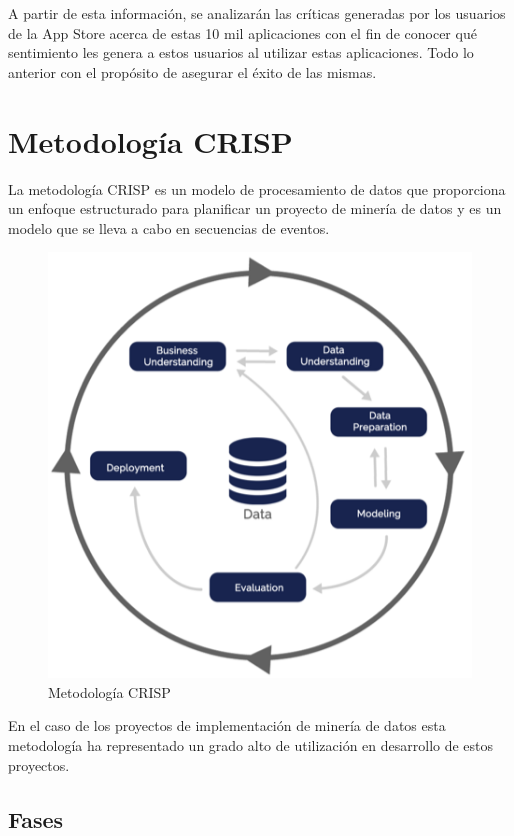 \documentclass[conference]{IEEEtran}
\begin{document}
A partir de esta información, se analizarán las críticas generadas por los usuarios de la App Store acerca de estas 10 mil aplicaciones con el fin de conocer qué sentimiento les genera a estos usuarios al utilizar estas aplicaciones. Todo lo anterior con el propósito de asegurar el éxito de las mismas.\\

\section{Metodología CRISP}
La metodología CRISP es un modelo de procesamiento de datos que proporciona un enfoque estructurado para planificar un proyecto de minería de datos y es un modelo que se lleva a cabo en secuencias de eventos.\\

\begin{figure}[htb]
\centering
\includegraphics[scale=1.2]{crisp-dm.png}
\caption{Metodología CRISP}
\end{figure}

En el caso de los proyectos de implementación de minería de
datos esta metodología ha representado un grado alto de utilización en desarrollo de estos proyectos.\\

\subsection{Fases}
\end{document}
